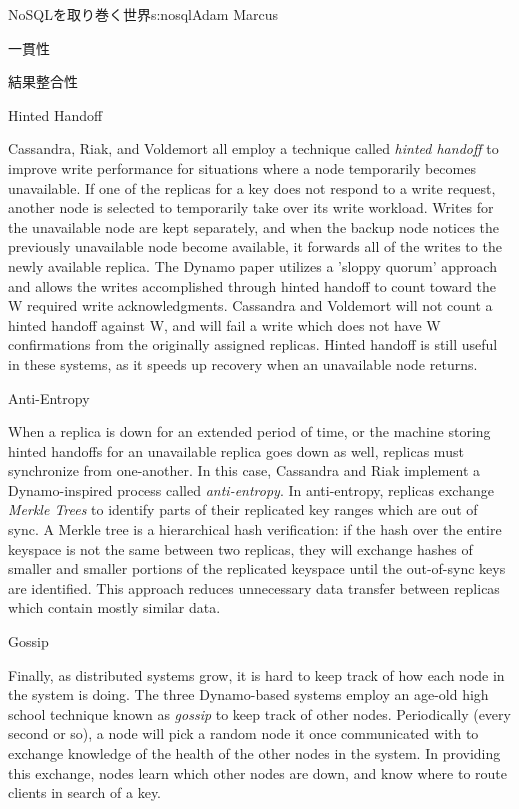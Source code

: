 \begin{aosachapter}{NoSQLを取り巻く世界}{s:nosql}{Adam Marcus}
\begin{aosasect1}{一貫性}
\begin{aosasect2}{結果整合性}
\begin{aosasect3}{Hinted Handoff}

Cassandra, Riak, and Voldemort all employ a technique called
\emph{hinted handoff} to improve write performance for situations
where a node temporarily becomes unavailable. If one of the replicas
for a key does not respond to a write request, another node is
selected to temporarily take over its write workload.  Writes for the
unavailable node are kept separately, and when the backup node notices
the previously unavailable node become available, it forwards all of
the writes to the newly available replica.  The Dynamo paper utilizes
a 'sloppy quorum' approach and allows the writes accomplished through
hinted handoff to count toward the W required write acknowledgments.
Cassandra and Voldemort will not count a hinted handoff against W, and
will fail a write which does not have W confirmations from the
originally assigned replicas.  Hinted handoff is still useful in these
systems, as it speeds up recovery when an unavailable node returns.

\end{aosasect3}

\begin{aosasect3}{Anti-Entropy}

When a replica is down for an extended period of time, or the machine
storing hinted handoffs for an unavailable replica goes down as well,
replicas must synchronize from one-another.  In this case, Cassandra
and Riak implement a Dynamo-inspired process called
\emph{anti-entropy}.  In anti-entropy, replicas exchange \emph{Merkle
Trees} to identify parts of their replicated key ranges which are
out of sync.  A Merkle tree is a hierarchical hash verification: if
the hash over the entire keyspace is not the same between two
replicas, they will exchange hashes of smaller and smaller portions of
the replicated keyspace until the out-of-sync keys are identified.
This approach reduces unnecessary data transfer between replicas which
contain mostly similar data.

\end{aosasect3}

\begin{aosasect3}{Gossip}

Finally, as distributed systems grow, it is hard to keep track of how
each node in the system is doing.  The three Dynamo-based systems
employ an age-old high school technique known as \emph{gossip} to keep
track of other nodes.  Periodically (every second or so), a node will
pick a random node it once communicated with to exchange knowledge of
the health of the other nodes in the system.  In providing this
exchange, nodes learn which other nodes are down, and know where to
route clients in search of a key.


\end{aosasect3}
\end{aosasect2}
\end{aosasect1}
\end{aosachapter}
